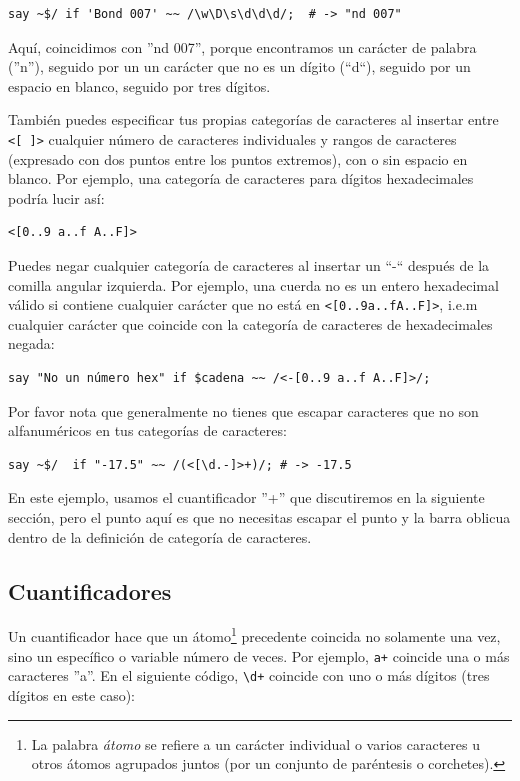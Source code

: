 \begin{verbatim}
say ~$/ if 'Bond 007' ~~ /\w\D\s\d\d\d/;  # -> "nd 007"
\end{verbatim}
%

Aquí, coincidimos con ''nd 007'', porque encontramos un
carácter de palabra (''n''), seguido por un un carácter que 
no es un dígito (``d``), seguido por un espacio en blanco,
seguido por tres dígitos.

También puedes especificar tus propias categorías de caracteres
al insertar entre \verb|<[ ]>| cualquier número de caracteres
individuales y rangos de caracteres (expresado con dos puntos 
entre los puntos extremos), con o sin espacio en blanco. Por 
ejemplo, una categoría de caracteres para dígitos hexadecimales
podría lucir así:
\begin{verbatim}
<[0..9 a..f A..F]>
\end{verbatim}

Puedes negar cualquier categoría de caracteres al insertar un 
``-`` después de la comilla angular izquierda. Por ejemplo,
una cuerda no es un entero hexadecimal válido si contiene
cualquier carácter que no está en \verb'<[0..9a..fA..F]>', i.e.m
cualquier carácter que coincide con la categoría de caracteres
de hexadecimales negada:

\begin{verbatim}
say "No un número hex" if $cadena ~~ /<-[0..9 a..f A..F]>/;
\end{verbatim}

Por favor nota que generalmente no tienes que escapar
caracteres que no son alfanuméricos en tus categorías de 
caracteres:

\begin{verbatim}
say ~$/  if "-17.5" ~~ /(<[\d.-]>+)/; # -> -17.5
\end{verbatim}

En este ejemplo, usamos el cuantificador ''+'' que discutiremos
en la siguiente sección, pero el punto aquí es que no necesitas
escapar el punto y la barra oblicua dentro de la definición de
categoría de caracteres.

\subsection{Cuantificadores}

Un cuantificador hace que un átomo\footnote{
La palabra \emph{átomo} se refiere a un carácter 
individual o varios caracteres u otros átomos
agrupados juntos (por un conjunto de paréntesis 
o corchetes).} precedente coincida no solamente 
una vez, sino un específico o variable número de
veces. Por ejemplo, \verb|a+| coincide una o más
caracteres ''a''. En el siguiente código, \verb|\d+| 
coincide con uno o más dígitos (tres dígitos en este caso):

